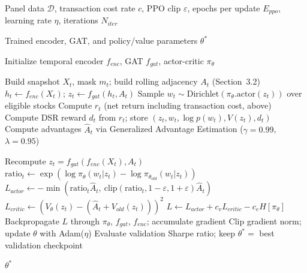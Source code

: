 \documentclass[runningheads]{llncs}
\begin{document}
\begin{algorithm}[ht]
\caption{End-to-end training of the proposed framework}
\label{alg:training}
\begin{algorithmic}[1]

\Require
Panel data $\mathcal{D}$, transaction cost rate $c$, PPO clip $\varepsilon$, epochs per update $E_{ppo}$, learning rate $\eta$, iterations $N_{iter}$

\Ensure
Trained encoder, GAT, and policy/value parameters $\theta^{*}$

\State Initialize temporal encoder $f_{enc}$, GAT $f_{gat}$, actor-critic $\pi_\theta$


        \State Build snapshot $X_t$, mask $m_t$; build rolling adjacency $A_t$ (Section~3.2)
        \State $h_t \leftarrow f_{enc}(X_t)$; \quad $z_t \leftarrow f_{gat}(h_t, A_t)$
        \State Sample $w_t \sim \mathrm{Dirichlet}(\pi_\theta.\mathrm{actor}(z_t))$ over eligible stocks
        \State Compute $r_t$ (net return including transaction cost, above)
        \State Compute DSR reward $d_t$ from $r_t$; store $(z_t, w_t, \log p(w_t), V(z_t), d_t)$
    \EndFor
    \State Compute advantages $\hat{A}_t$ via Generalized Advantage Estimation ($\gamma=0.99$, $\lambda=0.95$)

            \State Recompute $z_t=f_{gat}(f_{enc}(X_t), A_t)$ 
            \State $\mathrm{ratio}_t \leftarrow \exp(\log\pi_\theta(w_t|z_t)-\log\pi_{\theta_{old}}(w_t|z_t))$
            \State $L_{actor} \leftarrow -\min(\mathrm{ratio}_t\hat{A}_t,\ \mathrm{clip}(\mathrm{ratio}_t, 1-\varepsilon, 1+\varepsilon)\hat{A}_t)$
            \State $L_{critic} \leftarrow (V_\theta(z_t) - (\hat{A}_t + V_{old}(z_t)))^2$
            \State $L \leftarrow L_{actor} + c_v L_{critic} - c_e H[\pi_\theta]$
            \State Backpropagate $L$ through $\pi_\theta$, $f_{gat}$, $f_{enc}$; accumulate gradient
        \EndFor
        \State Clip gradient norm; update $\theta$ with Adam($\eta$)
    \EndFor
    \State Evaluate validation Sharpe ratio; keep $\theta^{*}=$ best validation checkpoint

\EndFor

\State \Return $\theta^{*}$

\end{algorithmic}
\end{algorithm}
\end{document}
